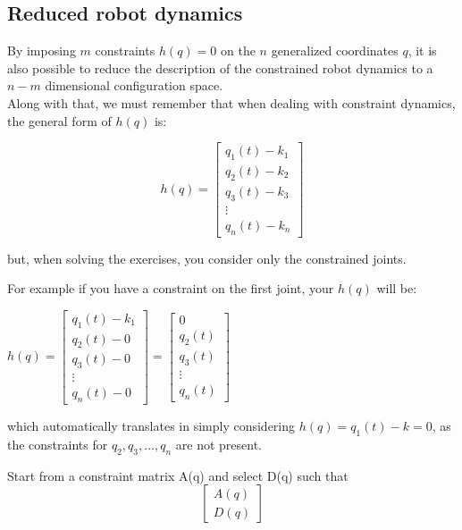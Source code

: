 \documentclass[a4paper,12pt]{article}
\begin{document}
\subsection{Reduced robot dynamics}
By imposing $m$ constraints $h(q)=0$ on the $n$ generalized coordinates $q$,
it is also possible to reduce the description of the constrained robot
dynamics to a $n-m$ dimensional configuration space.\\
Along with that, we must remember that when dealing with constraint dynamics, the general form of $h(q)$ is:

\begin{equation}
    h(q) = 
    \begin{bmatrix}
        q_1(t) - k_1 \\ 
        q_2(t) - k_2 \\ 
        q_3(t) - k_3 \\ 
        \vdots \\ 
        q_n(t) - k_n
    \end{bmatrix}
\end{equation}

but, when solving the exercises, you consider only the constrained joints.

For example if you have a constraint on the first joint, your $h(q)$ will be:
\begin{center}
    $h(q) = 
    \begin{bmatrix}
        q_1(t) - k_1 \\ 
        q_2(t) - 0 \\ 
        q_3(t) - 0 \\ 
        \vdots \\ 
        q_n(t) - 0
    \end{bmatrix}
    =
    \begin{bmatrix}
        0 \\ 
        q_2(t) \\ 
        q_3(t) \\ 
        \vdots \\ 
        q_n(t)
    \end{bmatrix}$
\end{center}

which automatically translates in simply considering $h(q) = q_1(t) - k = 0$, as the constraints for $q_{2}, q_{3}, ... , q_{n}$ are not present.

Start from a constraint matrix A(q) and select D(q) such that
\begin{equation}
\begin{bmatrix}
    A(q)\\
    D(q)
\end{bmatrix}
\end{equation}
\end{document}
